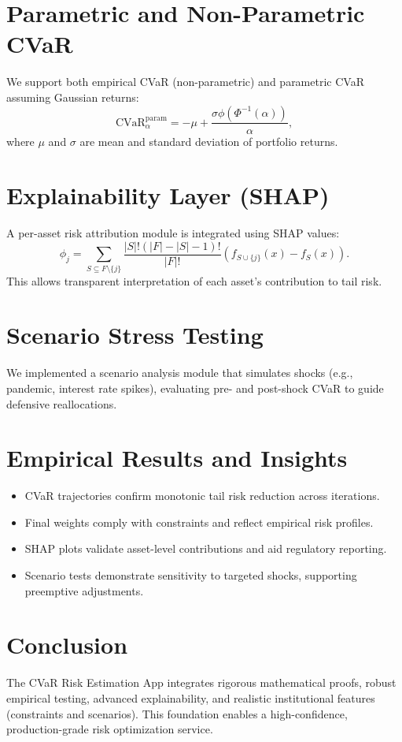 \documentclass[12pt]{article}
\begin{document}
\section{Parametric and Non-Parametric CVaR}
We support both empirical CVaR (non-parametric) and parametric CVaR assuming Gaussian returns:
\[
\text{CVaR}_\alpha^{\text{param}} = -\mu + \frac{\sigma \phi(\Phi^{-1}(\alpha))}{\alpha},
\]
where $\mu$ and $\sigma$ are mean and standard deviation of portfolio returns.

\section{Explainability Layer (SHAP)}
A per-asset risk attribution module is integrated using SHAP values:
\[
\phi_j = \sum_{S \subseteq F \setminus \{j\}} \frac{|S|!(|F| - |S| - 1)!}{|F|!}\left(f_{S \cup \{j\}}(x) - f_S(x)\right).
\]
This allows transparent interpretation of each asset's contribution to tail risk.

\section{Scenario Stress Testing}
We implemented a scenario analysis module that simulates shocks (e.g., pandemic, interest rate spikes), evaluating pre- and post-shock CVaR to guide defensive reallocations.

\section{Empirical Results and Insights}
\begin{itemize}
\item CVaR trajectories confirm monotonic tail risk reduction across iterations.
\item Final weights comply with constraints and reflect empirical risk profiles.
\item SHAP plots validate asset-level contributions and aid regulatory reporting.
\item Scenario tests demonstrate sensitivity to targeted shocks, supporting preemptive adjustments.
\end{itemize}

\section{Conclusion}
The CVaR Risk Estimation App integrates rigorous mathematical proofs, robust empirical testing, advanced explainability, and realistic institutional features (constraints and scenarios). This foundation enables a high-confidence, production-grade risk optimization service.
\end{document}

